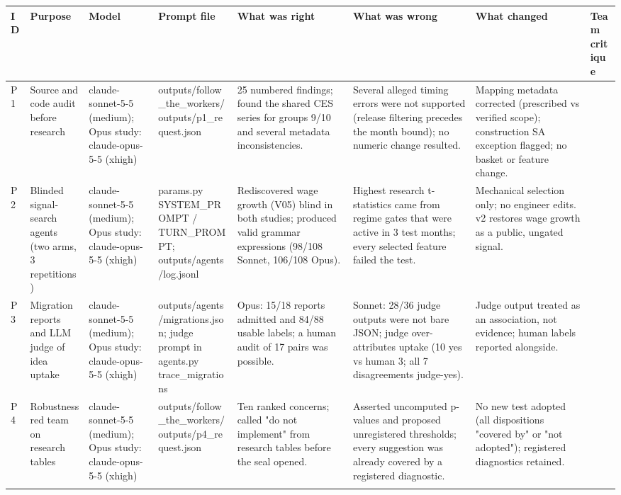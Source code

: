 {\scriptsize\setlength{\tabcolsep}{3pt}\begin{longtable}{@{}p{0.5cm}p{2.0cm}p{1.8cm}p{2.1cm}p{2.2cm}p{2.2cm}p{2.2cm}p{1.4cm}@{}}
\toprule ID & Purpose & Model & Prompt file & What was right & What was wrong & What changed & Team critique \\ \midrule \endhead
P1 & Source and code audit before research & claude-sonnet-5-5 (medium); Opus study: claude-opus-5-5 (xhigh) & outputs/\allowbreak{}follow\_\allowbreak{}the\_\allowbreak{}workers/\allowbreak{}outputs/\allowbreak{}p1\_\allowbreak{}request.json & 25 numbered findings; found the shared CES series for groups 9/\allowbreak{}10 and several metadata inconsistencies. & Several alleged timing errors were not supported (release filtering precedes the month bound); no numeric change resulted. & Mapping metadata corrected (prescribed vs verified scope); construction SA exception flagged; no basket or feature change. &  \\ \addlinespace
P2 & Blinded signal-search agents (two arms, 3 repetitions) & claude-sonnet-5-5 (medium); Opus study: claude-opus-5-5 (xhigh) & params.py SYSTEM\_\allowbreak{}PROMPT /\allowbreak{} TURN\_\allowbreak{}PROMPT; outputs/\allowbreak{}agents/\allowbreak{}log.jsonl & Rediscovered wage growth (V05) blind in both studies; produced valid grammar expressions (98/\allowbreak{}108 Sonnet, 106/\allowbreak{}108 Opus). & Highest research t-statistics came from regime gates that were active in 3 test months; every selected feature failed the test. & Mechanical selection only; no engineer edits. v2 restores wage growth as a public, ungated signal. &  \\ \addlinespace
P3 & Migration reports and LLM judge of idea uptake & claude-sonnet-5-5 (medium); Opus study: claude-opus-5-5 (xhigh) & outputs/\allowbreak{}agents/\allowbreak{}migrations.json; judge prompt in agents.py trace\_\allowbreak{}migrations & Opus: 15/\allowbreak{}18 reports admitted and 84/\allowbreak{}88 usable labels; a human audit of 17 pairs was possible. & Sonnet: 28/\allowbreak{}36 judge outputs were not bare JSON; judge over-attributes uptake (10 yes vs human 3; all 7 disagreements judge-yes). & Judge output treated as an association, not evidence; human labels reported alongside. &  \\ \addlinespace
P4 & Robustness red team on research tables & claude-sonnet-5-5 (medium); Opus study: claude-opus-5-5 (xhigh) & outputs/\allowbreak{}follow\_\allowbreak{}the\_\allowbreak{}workers/\allowbreak{}outputs/\allowbreak{}p4\_\allowbreak{}request.json & Ten ranked concerns; called "do not implement" from research tables before the seal opened. & Asserted uncomputed p-values and proposed unregistered thresholds; every suggestion was already covered by a registered diagnostic. & No new test adopted (all dispositions "covered by" or "not adopted"); registered diagnostics retained. &  \\ \addlinespace

\end{longtable}}

